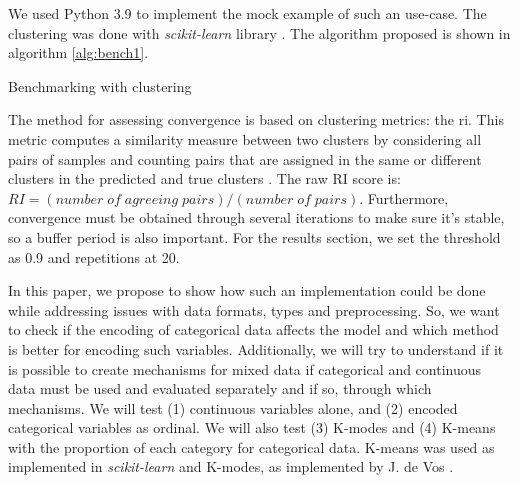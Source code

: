 We used Python 3.9 to implement the mock example of such an use-case. The clustering was done with \textit{scikit-learn} library \cite{scikit-learn}. The algorithm proposed is shown in algorithm \ref{alg:bench1}.

\begin{algorithm}[hbtp]
\caption{Benchmarking with clustering}
\label{alg:bench1}

\SetAlgoLined






\end{algorithm}

The method for assessing convergence is based on clustering metrics: the \ac{ri}. This metric computes a similarity measure between two clusters by considering all pairs of samples and counting pairs that are assigned in the same or different clusters in the predicted and true clusters \cite{hubertComparingPartitions1985}. The raw RI score is: $RI = (number\; of\; agreeing\; pairs) / (number\; of\; pairs)$.
Furthermore, convergence must be obtained through several iterations to make sure it's stable, so a buffer period is also important. For the results section, we set the threshold as 0.9 and repetitions at 20.

In this paper, we propose to show how such an implementation could be done while addressing issues with data formats, types and preprocessing. So, we want to check if the encoding of categorical data affects the model and which method is better for encoding such variables. Additionally, we will try to understand if it is possible to create mechanisms for mixed data if categorical and continuous data must be used and evaluated separately and if so, through which mechanisms.
We will test (1) continuous variables alone, and (2) encoded categorical variables as ordinal. We will also test (3) K-modes  and (4) K-means with the proportion of each category for categorical data.
K-means was used as implemented in \textit{scikit-learn} \cite{scikit-learn} and K-modes, as implemented by J. de Vos \cite{devos2015}.
